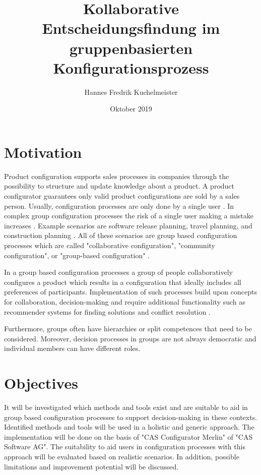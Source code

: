 \documentclass{article}
\title{Kollaborative Entscheidungsfindung im gruppenbasierten Konfigurationsprozess}
\author{Hannes Fredrik Kuchelmeister}
\date{Oktober 2019}
\begin{document}
\maketitle

\section{Motivation}

Product configuration supports sales processes in companies through the possibility to structure and update knowledge about a product. A product configurator guarantees only valid product configurations are sold by a sales person. Usually, configuration processes are only done by a single user \cite{felferningGroupBasedConfiguration2016, velasquez-guevaraMultiSPLOTSupportingMultiuser2018a}.
In complex group configuration processes the risk of a single user making a mistake increases \cite{felfernigGroupDecisionSupport2011}.
Example scenarios are software release planning, travel planning, and construction planning \cite{felfernigOpenConfiguration2014}. 
All of these scenarios are group based configuration processes which are called "collaborative configuration", "community configuration", or "group-based configuration" \cite{felferningGroupBasedConfiguration2016, felfernigOpenConfiguration2014,mendoncaCollaborativeProductConfiguration2008,felfernigKnowledgebasedConfigurationResearch2014}.

In a group based configuration processes a group of people collaboratively configures a product which results in a configuration that ideally includes all preferences of participants. Implementation of such processes build upon concepts for collaboration, decision-making and require additional functionality such as recommender systems for finding solutions and conflict resolution \cite{felfernigKnowledgebasedConfigurationResearch2014}.


Furthermore, groups often have hierarchies or split competences that need to be considered. Moreover, decision processes in groups are not always democratic and individual members can have different roles.

\section{Objectives}

It will be investigated which methods and tools exist and are suitable to aid in group based configuration processes to support decision-making in these contexts. Identified methods and tools will be used in a holistic and generic approach. 
The implementation will be done on the basis of "CAS Configurator Merlin" of "CAS Software AG". The suitability to aid users in configuration processes with this approach will be evaluated based on realistic scenarios. In addition, possible limitations and improvement potential will be discussed.
\end{document}
